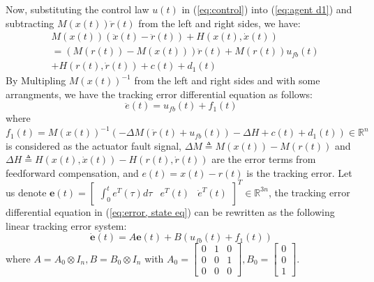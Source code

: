 \documentclass[journal,12pt,onecolumn,draftclsnofoot,]{IEEEtran}
\newtheorem{remark}{Remark}
\begin{document}
Now, substituting the control law $u(t)$ in (\ref{eq:control}) into (\ref{eq:agent d1}) and subtracting $M(x(t))\ddot{r}(t)$ from the left and right sides, we have:
\begin{equation} \label{eq:agent1}
    \begin{split}
        & M(x(t))(\ddot{x}(t)-\ddot{r}(t)) + H(x(t),\dot{x}(t)) \\
        & =(M(r(t))-M(x(t)))\ddot{r}(t) + M(r(t))u_{fb}(t) \\
        & + H(r(t),\dot{r}(t)) + c(t) + d_1(t)
    \end{split}
\end{equation}
By Multipling $M(x(t))^{-1}$ from the left and right sides and with some arrangments, we have the tracking error differential equation as follows:
\begin{equation} \label{eq:error, state eq}
    \ddot{e}(t) = u_{fb}(t) + f_1(t)
\end{equation}
where $f_1(t) = M(x(t))^{-1}(-\Delta M (\ddot{r}(t)+u_{fb}(t)) -\Delta H + c(t) + d_1(t))\in\mathbb{R}^n$ is considered as the actuator fault signal, $\Delta M \triangleq M(x(t)) - M(r(t))$ and $ \Delta H \triangleq H(x(t),\dot{x}(t)) - H(r(t),\dot{r}(t))$ are the error terms from feedforward compensation, and $e(t)= x(t)-r(t)$ is the tracking error.
Let us denote $\pmb{e}(t)=\begin{bmatrix}
    \int_{0}^{t}e^T(\tau)d\tau & e^T(t) & \dot{e}^T(t)
\end{bmatrix}^T\in\mathbb{R}^{3n}$, the tracking error differential equation in (\ref{eq:error, state eq}) can be rewritten as the following linear tracking error system:
\begin{equation} \label{eq:linear f1}
    \dot{\pmb{e}}(t)=A\pmb{e}(t)+B(u_{fb}(t)+f_1(t))
\end{equation}
where $ A = A_0\otimes I_n, B = B_0\otimes I_n$
with $A_0 = \begin{bmatrix}
    0 & 1 & 0 \\ 0 & 0 & 1 \\ 0 & 0 & 0
\end{bmatrix}, B_0 = \begin{bmatrix}
0 \\ 0 \\ 1
\end{bmatrix}$. 
\end{document}
